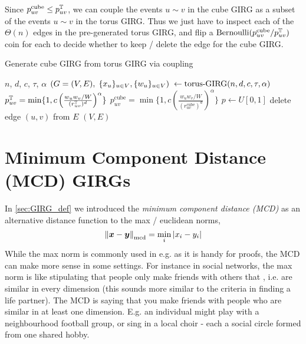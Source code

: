 Since $p_{uv}^\text{cube} \leq p_{uv}^{\mathbb{T}}$, we can couple the events $u \sim v$ in the cube GIRG as a subset of the events $u \sim v$ in the torus GIRG. Thus we just have to inspect each of the $\Theta(n)$ edges in the pre-generated torus GIRG, and flip a $\operatorname{Bernoulli}(p_{uv}^\text{cube} / p_{uv}^{\mathbb{T}})$ coin for each to decide whether to keep / delete the edge for the cube GIRG.

\begin{algorithm}
\begin{algorithmic}
    \caption{Generate cube GIRG from torus GIRG via coupling}\label{alg:cube_coupling}
    \Require $n$, $d$, $c$, $\tau$, $\alpha$
    \State $\left ( G=(V,E),\; \{x_u\}_{u \in V}, \{w_u\}_{u \in V} \right )\; \gets \text{torus-}\mathrm{GIRG}(n,d,c,\tau, \alpha)$
        \State $p_{uv}^{\mathbb{T}} = \min \{1, c \left (
            \frac{w_u w_v / W}{(r_{uv}^{\mathbb{T}})^d} \right )^\alpha \}$
        \State $p_{uv}^\text{cube} = \min \{1, c \left (
            \frac{w_u w_v / W}{(r_{uv}^\text{cube})^d} \right )^\alpha \}$
        \State $p \gets U[0,1]$
            \State delete edge $(u,v)$ from $E$
        \EndIf
    \EndFor
    \State \Return $(V,E)$
\end{algorithmic}
\end{algorithm}



\section{Minimum Component Distance (MCD) GIRGs}
In \cref{sec:GIRG_def} we introduced the \textit{minimum component distance (MCD)} as an alternative distance function to the max / euclidean norms,
\begin{equation}
    \left\lVert \bm{x} - \bm{y}\right\rVert_{\mathrm{mcd}} = \min_i |x_i - y_i|
\end{equation}
While the max norm is commonly used in e.g. \cite{bringmann2019geometric} as it is handy for proofs, the MCD can make more sense in some settings. For instance in social networks, the max norm is like stipulating that people only make friends with others that , i.e. are similar in every dimension (this sounds more similar to the criteria in finding a life partner). The MCD is saying that you make friends with people who are similar in at least one dimension. E.g. an individual might play with a neighbourhood football group, or sing in a local choir - each a social circle formed from one shared hobby.

